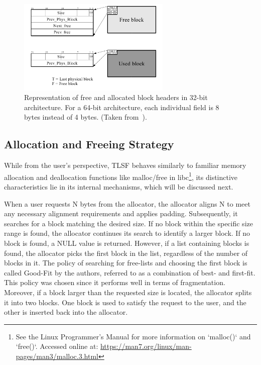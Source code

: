 
\begin{figure}[H]
    \centering
    \includegraphics[width=0.65\textwidth]{figures/blockheader_reference.png}
    \caption{Representation of free and allocated block headers in 32-bit architecture. For a 64-bit architecture, each individual field is 8 bytes instead of 4 bytes. (Taken from~\cite{TLSF}).}
    \label{fig:blockheader_reference}
\end{figure}

\subsection{Allocation and Freeing Strategy}

While from the user's perspective, TLSF behaves similarly to familiar memory allocation and deallocation functions like malloc/free in libc\footnote{See the Linux Programmer's Manual for more information on `malloc()` and `free()`. Accessed online at: \url{https://man7.org/linux/man-pages/man3/malloc.3.html}}, its distinctive characteristics lie in its internal mechanisms, which will be discussed next.

When a user requests N bytes from the allocator, the allocator aligns N to meet any necessary alignment requirements and applies padding. Subsequently, it searches for a block matching the desired size. If no block within the specific size range is found, the allocator continues its search to identify a larger block. If no block is found, a NULL value is returned. However, if a list containing blocks is found, the allocator picks the first block in the list, regardless of the number of blocks in it. The policy of searching for free-lists and choosing the first block is called Good-Fit by the authors, referred to as a combination of best- and first-fit. This policy was chosen since it performs well in terms of fragmentation. Moreover, if a block larger than the requested size is located, the allocator splits it into two blocks. One block is used to satisfy the request to the user, and the other is inserted back into the allocator.

